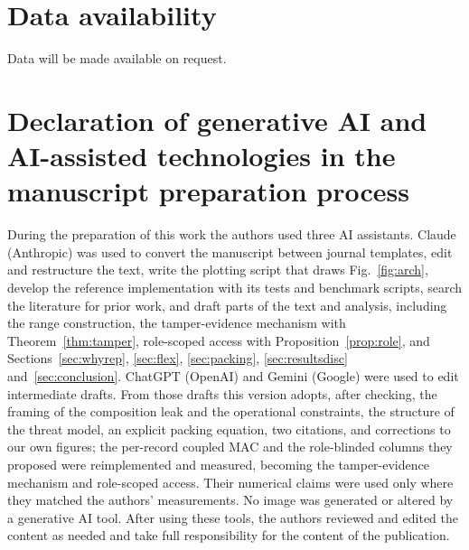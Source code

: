 \documentclass[a4paper,fleqn]{cas-sc}
\begin{document}
\section*{Data availability}
Data will be made available on request.

\section*{Declaration of generative AI and AI-assisted technologies in the
manuscript preparation process}
During the preparation of this work the authors used three AI assistants.
Claude (Anthropic) was used to convert the manuscript between journal
templates, edit and restructure the text, write the plotting script that draws
Fig.~\ref{fig:arch}, develop the reference implementation with its tests and
benchmark scripts, search the literature for prior work, and draft parts of
the text and analysis, including the range construction, the tamper-evidence
mechanism with Theorem~\ref{thm:tamper}, role-scoped access with
Proposition~\ref{prop:role}, and Sections~\ref{sec:whyrep}, \ref{sec:flex},
\ref{sec:packing}, \ref{sec:resultsdisc} and~\ref{sec:conclusion}. ChatGPT
(OpenAI) and Gemini (Google) were used to edit intermediate drafts. From
those drafts this version adopts, after checking, the framing of the
composition leak and the operational constraints, the structure of the threat
model, an explicit packing equation, two citations, and corrections to our
own figures; the per-record coupled MAC and the role-blinded columns they
proposed were reimplemented and measured, becoming the tamper-evidence
mechanism and role-scoped access. Their numerical claims were used only where
they matched the authors' measurements. No image
was generated or altered by a generative AI tool. After using these tools, the
authors reviewed and edited the content as needed and take full responsibility
for the content of the publication.



\end{document}
